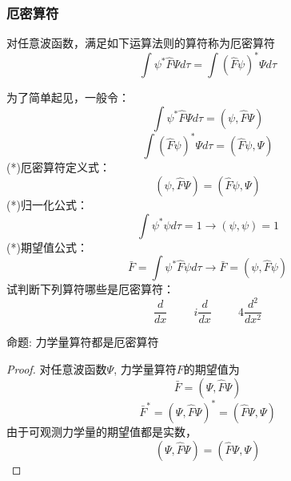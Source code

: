 \begin{frame} [allowframebreaks=]
    \frametitle{厄密算符}
    \begin{tcolorbox1}{}
    对任意波函数，满足如下运算法则的算符称为厄密算符\\
        $$\int \psi^* \hat{F} \Psi d\tau =\int (\hat{F}\psi)^* \Psi d\tau $$
    \end{tcolorbox1}
    为了简单起见，一般令： $$\int \psi^* \hat{F} \Psi d\tau= (\psi,\hat{F}\Psi)$$
    $$\int (\hat{F}\psi)^* \Psi d\tau = (\hat{F}\psi,\Psi) $$
    (*)厄密算符定义式： $$(\psi,\hat{F}\Psi)= (\hat{F}\psi,\Psi) $$
    (*)归一化公式： $$ \int \psi^{*} \psi d \tau=1 \to (\psi,\psi)=1$$
    (*)期望值公式： $$ \bar{F}=\int \psi^{*} \hat{F} \psi d \tau \to \bar{F}= (\psi,\hat{F}\psi) $$
    试判断下列算符哪些是厄密算符：\\
    $$\frac{d}{dx} \hspace{1cm}  i\frac{d}{dx} \hspace{1cm} 4\frac{d^2}{dx^2} $$
\end{frame} 

\begin{frame} [allowframebreaks=]
    \begin{tcolorbox1}{命题:}
        力学量算符都是厄密算符  
        \end{tcolorbox1}
    \begin{proof}
        对任意波函数$\Psi$, 力学量算符$F$的期望值为\\
        $$\bar{F}=(\Psi,\hat{F} \Psi) $$
        $$\bar{F}^*=(\Psi, \hat{F} \Psi)^* = (\hat{F}\Psi, \Psi) $$
        由于可观测力学量的期望值都是实数，\\
        $$(\Psi,\hat{F}\Psi)=(\hat{F} \Psi, \Psi) $$
    \end{proof}
\end{frame} 

